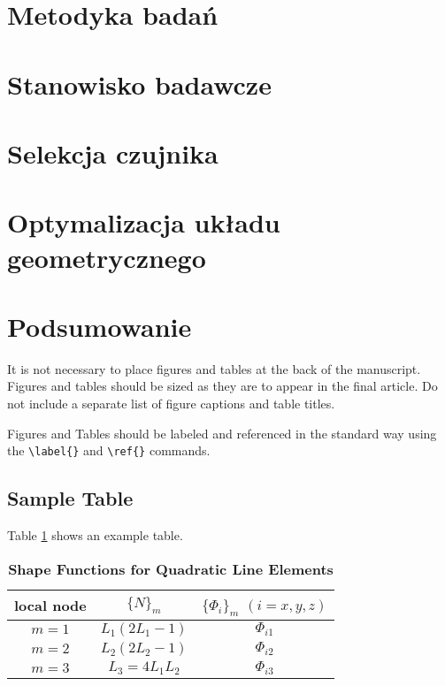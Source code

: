 \documentclass[9pt,twocolumn,twoside]{optica}
\begin{document}
\section{Metodyka badań} %

\section{Stanowisko badawcze}

\section{Selekcja czujnika}
\section{Optymalizacja układu geometrycznego}
\section{Podsumowanie}


It is not necessary to place figures and tables at the back of the manuscript. Figures and tables should be sized as they are to appear in the final article. Do not include a separate list of figure captions and table titles.

Figures and Tables should be labeled and referenced in the standard way using the \verb|\label{}| and \verb|\ref{}| commands.

\subsection{Sample Table}

Table \ref{tab:shape-functions} shows an example table.

\begin{table}[htbp]
\centering
\caption{\bf Shape Functions for Quadratic Line Elements}
\begin{tabular}{ccc}
\hline
local node & $\{N\}_m$ & $\{\Phi_i\}_m$ $(i=x,y,z)$ \\
\hline
$m = 1$ & $L_1(2L_1-1)$ & $\Phi_{i1}$ \\
$m = 2$ & $L_2(2L_2-1)$ & $\Phi_{i2}$ \\
$m = 3$ & $L_3=4L_1L_2$ & $\Phi_{i3}$ \\
\hline
\end{tabular}
  \label{tab:shape-functions}
\end{table}
\end{document}
